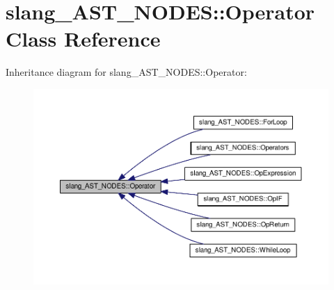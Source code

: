 \hypertarget{classslang__AST__NODES_1_1Operator}{}\section{slang\+\_\+\+A\+S\+T\+\_\+\+N\+O\+D\+ES\+:\+:Operator Class Reference}
\label{classslang__AST__NODES_1_1Operator}


Inheritance diagram for slang\+\_\+\+A\+S\+T\+\_\+\+N\+O\+D\+ES\+:\+:Operator\+:
\nopagebreak
\begin{figure}[H]
\begin{center}
\leavevmode
\includegraphics[width=350pt]{classslang__AST__NODES_1_1Operator__inherit__graph}
\end{center}
\end{figure}
